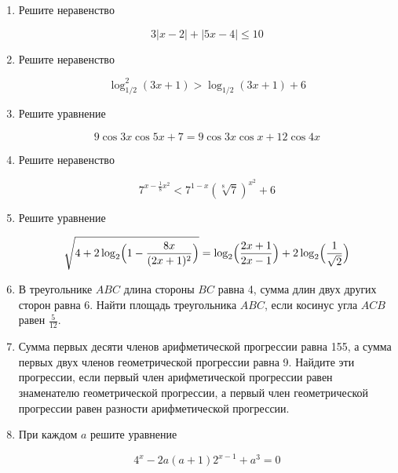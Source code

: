 \documentclass[11pt,a5paper]{report}
\begin{document}
\begin{enumerate}

\item Решите неравенство

$$3|x-2|+|5x-4|\leqslant 10$$

\item Решите неравенство

$$\log_{1/2}^2(3x+1)>\log_{1/2}(3x+1)+6$$

\item Решите уравнение

$$9\cos 3x \cos 5x + 7 = 9\cos 3x \cos x + 12\cos 4x$$

\item Решите неравенство

$$7^{x-\frac{1}{8}x^2} < 7^{1-x} (\sqrt[8]{7})^{x^2} + 6$$

\item Решите уравнение

$$\sqrt{4+2\log_2\Bigl(1-\frac{8x}{(2x+1)^2}\Bigr)} = \log_2\Bigl(\frac{2x+1}{2x-1}\Bigr)+2\log_2\Bigl(\frac{1}{\sqrt{2}}\Bigr)$$

\item В треугольнике $ABC$ длина стороны $BC$ равна 4, сумма длин двух других сторон равна 6. Найти площадь треугольника $ABC$, если косинус угла $ACB$ равен $\frac{5}{12}$.

\item Сумма первых десяти членов арифметической прогрессии равна 155, а сумма первых двух членов геометрической прогрессии равна 9. Найдите эти прогрессии, если первый член арифметической прогрессии равен знаменателю геометрической прогрессии, а первый член геометрической прогрессии равен разности арифметической прогрессии.

\item При каждом $a$ решите уравнение

$$4^x - 2a(a+1)2^{x-1} + a^3 = 0$$

\end{enumerate}

\newpage
\end{document}
